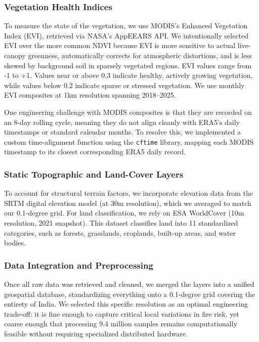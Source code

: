 \documentclass[11pt]{article}
\begin{document}
\subsubsection{Vegetation Health Indices}

To measure the state of the vegetation, we use MODIS's Enhanced Vegetation Index (EVI), retrieved via NASA's AppEEARS API. We intentionally selected EVI over the more common NDVI because EVI is more sensitive to actual live-canopy greenness, automatically corrects for atmospheric distortions, and is less skewed by background soil in sparsely vegetated regions. EVI values range from -1 to +1. Values near or above 0.3 indicate healthy, actively growing vegetation, while values below 0.2 indicate sparse or stressed vegetation. We use monthly EVI composites at 1km resolution spanning 2018--2025. 

One engineering challenge with MODIS composites is that they are recorded on an 8-day rolling cycle, meaning they do not align cleanly with ERA5's daily timestamps or standard calendar months. To resolve this, we implemented a custom time-alignment function using the \texttt{cftime} library, mapping each MODIS timestamp to its closest corresponding ERA5 daily record.

\subsubsection{Static Topographic and Land-Cover Layers}

To account for structural terrain factors, we incorporate elevation data from the SRTM digital elevation model (at 30m resolution), which we averaged to match our 0.1-degree grid. For land classification, we rely on ESA WorldCover (10m resolution, 2021 snapshot). This dataset classifies land into 11 standardized categories, such as forests, grasslands, croplands, built-up areas, and water bodies.

\subsubsection{Data Integration and Preprocessing}

Once all raw data was retrieved and cleaned, we merged the layers into a unified geospatial database, standardizing everything onto a 0.1-degree grid covering the entirety of India. We selected this specific resolution as an optimal engineering trade-off: it is fine enough to capture critical local variations in fire risk, yet coarse enough that processing 9.4 million samples remains computationally feasible without requiring specialized distributed hardware.
\end{document}

